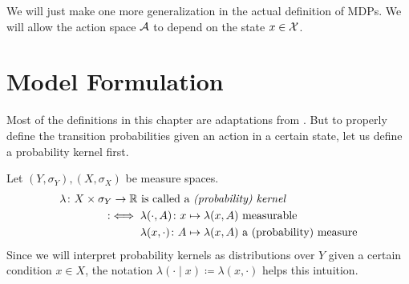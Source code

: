 We will just make one more generalization in the actual definition of MDPs. We will allow the action space \(\mathcal{A}\) to depend on the state \(x\in\mathcal{X}\).

\section{Model Formulation}
Most of the definitions in this chapter are adaptations from \textcite{szepesvariAlgorithmsReinforcementLearning2010}.
But to properly define the transition probabilities given an action in a certain state, let us define a probability kernel first.

\begin{definition}[Kernel]
	Let \((Y,\sigma_Y), (X,\sigma_X)\) be measure spaces.
	\begin{align*}
		&\lambda\colon X\times\sigma_Y\to \mathbb{R} \text{ is called a \emph{(probability) kernel}}\\
		&\qquad \qquad :\iff 
		\begin{aligned}[t]
			&\lambda(\cdot,A)\colon x\mapsto \lambda(x,A) \text{ measurable}\\
			&\lambda(x,\cdot)\colon A\mapsto \lambda(x,A) \text{ a (probability) measure}
		\end{aligned}
	\end{align*}
	Since we will interpret probability kernels as distributions over \(Y\) given a  certain condition \(x\in X\), the notation \(\lambda(\cdot\mid x) \coloneqq \lambda(x,\cdot)\) helps this intuition. 
\end{definition}

